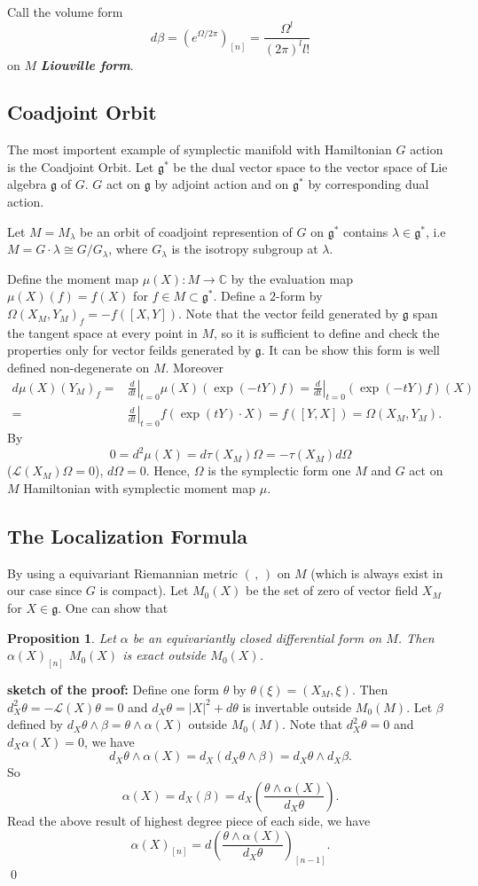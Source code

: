 \documentclass[11pt]{amsart}
\newtheorem{Prop}[Thm]{Proposition}
\def\cL{{\mathcal{L}}}
\def\bC{{\mathbb{C}}}
\def\fgg{{\mathfrak{g}}}
\def\kw#1{{\bf \em #1}}
\def\ddt{\left.\frac{d}{dt}\right|_{t=0}}
\def\sproof{{\bf sketch of the proof:}}
\begin{document}
Call the volume form 
\[
d\beta=(e^{\Omega/2\pi})_[n] = \frac{\Omega^l}{(2\pi)^ll!}
\] 
on $M$ \kw{Liouville form}.

\subsection{Coadjoint Orbit}\label{Sec:co1}
The most importent example of symplectic manifold with Hamiltonian $G$
action is the Coadjoint Orbit. 
Let $\fgg^*$ be the dual vector space to the vector space of Lie
algebra $\fgg$ of $G$. $G$ act on $\fgg$ by adjoint action and on
$\fgg^*$ by corresponding dual action.

Let $M=M_\lambda$ be an orbit of coadjoint represention of $G$ on
$\fgg^*$ contains $\lambda \in \fgg^*$, i.e $M = G\cdot \lambda\cong
G/G_\lambda$, where $G_\lambda$ is the isotropy subgroup at $\lambda$.

Define the moment map $\mu(X)\colon M \to \bC$ by the evaluation map
$\mu(X)(f) = f(X)$ for $f\in M \subset \fgg^*$.
Define a $2$-form by $\Omega(X_M,Y_M)_f =-
f([X,Y])$. Note that the vector feild generated by $\fgg$ span the
tangent space at every point in $M$, so it is sufficient to define and
check the properties only for vector feilds generated by $\fgg$. It can be show this form is well defined non-degenerate on
$M$.
Moreover 
\[
\begin{split}
d\mu(X)(Y_M)_f  =& \ddt \mu(X)(\exp(-tY)f) =  \ddt(\exp(-tY)f)(X) \\
=&
\ddt f(\exp(tY)\cdot X) = f([Y,X]) = \Omega(X_M,Y_M).
\end{split}
\]
By 
\[
0 = d^2\mu(X) = d\tau(X_M)\Omega = -\tau(X_M) d\Omega
\] ($\cL(X_M)\Omega=0$), $d\Omega=0$.
Hence, $\Omega$ is the symplectic form one $M$ and $G$ act on $M$
Hamiltonian with symplectic moment map $\mu$.



\subsection{The Localization Formula}
By using a equivariant Riemannian metric $(\,,\,)$ on $M$ (which is always exist
in our case since $G$ is compact). 
Let $M_0(X)$ be the set of zero of vector field $X_M$ for $X\in \fgg$.
One can show that 
\begin{Prop}
Let $\alpha$ be an equivariantly closed differential form on $M$. 
Then $\alpha(X)_{[n]}$ $M_0(X)$ is exact outside $M_0(X)$.
\end{Prop}
\sproof 
Define one form $\theta$ by $\theta(\xi) = (X_M, \xi)$. 
Then $d_X^2 \theta  = -\cL(X)\theta  = 0$ and $d_X\theta  = |X|^2 + d\theta$ is
invertable outside $M_0(M)$. 
Let $\beta$ defined by $ d_X\theta \wedge \beta = \theta \wedge \alpha(X)$ outside $M_0(M)$.
Note that $d_X^2 \theta=0$ and $d_X\alpha(X) = 0$, we have
\[
d_X\theta \wedge \alpha(X) = 
d_X(d_X\theta \wedge \beta) = d_X\theta \wedge d_X\beta.
\]
So 
\[
\alpha(X) = d_X(\beta) = d_X\left(\frac{\theta\wedge \alpha(X)}{d_X\theta}\right).
\]
Read the above result of highest degree piece of each side, we have
\[
\alpha(X)_{[n]} = d\left(\frac{\theta\wedge \alpha(X)}{d_X\theta}\right)_{[n-1]}.
\] \qed
\end{document}
